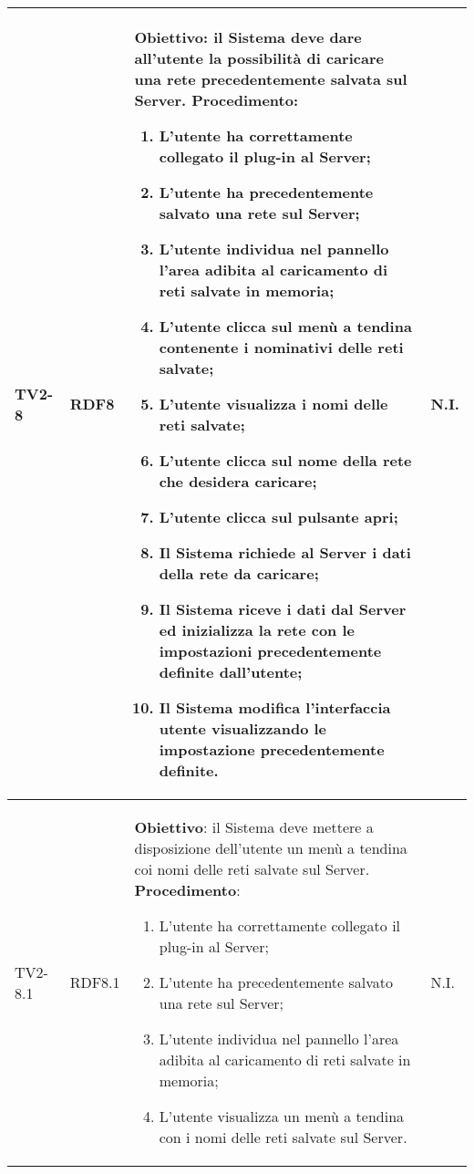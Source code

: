 \begin{longtable}{|C{.15\textwidth}|C{.13\textwidth}|m{.52\textwidth}|C{.08\textwidth}|}
TV2-8 & RDF8 &
	\textbf{Obiettivo}: il Sistema deve dare all'utente la possibilità di caricare una rete precedentemente salvata sul Server. \newline
	\textbf{Procedimento}:
	\begin{enumerate}
		\item L'utente ha correttamente collegato il plug-in al Server;
		\item L'utente ha precedentemente salvato una rete sul Server;
		\item L'utente individua nel pannello l'area adibita al caricamento di reti salvate in memoria;
		\item L'utente clicca sul menù a tendina contenente i nominativi delle reti salvate;
		\item L'utente visualizza i nomi delle reti salvate;
		\item L'utente clicca sul nome della rete che desidera caricare;
		\item L'utente clicca sul pulsante apri;
		\item Il Sistema richiede al Server i dati della rete da caricare;
		\item Il Sistema riceve i dati dal Server ed inizializza la rete con le impostazioni precedentemente definite dall'utente;
		\item Il Sistema modifica l'interfaccia utente visualizzando le impostazione precedentemente definite.
	\end{enumerate}
	& N.I. \\
\hline

TV2-8.1 & RDF8.1 &
	\textbf{Obiettivo}: il Sistema deve mettere a disposizione dell'utente un menù a tendina coi nomi delle reti salvate sul Server. \newline
	\textbf{Procedimento}:
	\begin{enumerate}
		\item L'utente ha correttamente collegato il plug-in al Server;
		\item L'utente ha precedentemente salvato una rete sul Server;
		\item L'utente individua nel pannello l'area adibita al caricamento di reti salvate in memoria;
		\item L'utente visualizza un menù a tendina con i nomi delle reti salvate sul Server.
	\end{enumerate}
	& N.I. \\
\hline


\end{longtable}
